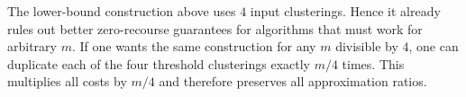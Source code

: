 \begin{remark}
The lower-bound construction above uses \(4\) input clusterings. Hence it already rules out better zero-recourse guarantees for algorithms that must work for arbitrary \(m\). If one wants the same construction for any \(m\) divisible by \(4\), one can duplicate each of the four threshold clusterings exactly \(m/4\) times. This multiplies all costs by \(m/4\) and therefore preserves all approximation ratios.
\end{remark}